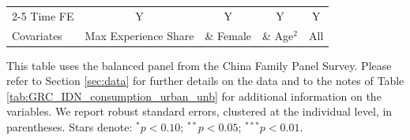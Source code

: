 \begin{table}[htbp]
\begin{threeparttable}
\begin{tabular}{l cccc}
\cmidrule{2-5} Time FE & Y & Y & Y & Y \\ Covariates & Max Experience Share & \& Female & \& Age$^2$ & All \\ \bottomrule \end{tabular} \begin{tablenotes}[flushleft] \footnotesize \item{This table uses the balanced panel from the China Family Panel Survey. Please refer to Section \ref{sec:data} for further details on the data and to the notes of Table \ref{tab:GRC_IDN_consumption_urban_unb} for additional information on the variables. We report robust standard errors, clustered at the individual level, in parentheses. Stars denote: $^{*} p<0.10$; $^{**} p<0.05$; $^{***} p<0.01$.} \end{tablenotes} \end{threeparttable} \end{table}
